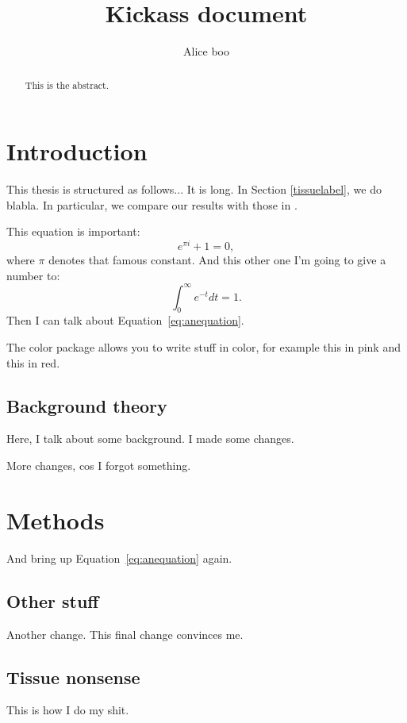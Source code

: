 \documentclass[a4paper,11pt,leqno]{article}
\numberwithin{equation}{section}
\begin{document}

\title{Kickass document}
\author{Alice boo}

\maketitle


\begin{abstract}
This is the abstract.
\end{abstract}


\tableofcontents

\newpage

\section{Introduction}

This thesis is structured as follows... It is long. In Section \ref{tissuelabel}, we do blabla. In particular, we compare our results with those in \cite{RN33}.

This equation is important:
%
$$e^{\pi i}+1=0,$$
%
where $\pi$ denotes that famous constant. And this other one I'm going to give a number to:
%
\begin{equation}\label{eq:anequation}
\int_0^\infty e^{-t}dt = 1.
\end{equation}
%
Then I can talk about Equation~\eqref{eq:anequation}. 

The color package allows you to write stuff in color, for example {\color{magenta} this in pink} and {\color{red} this in red}.

\subsection{Background theory}



Here, I talk about some background. I made some changes.

More changes, cos I forgot something.

\section{Methods}

And bring up Equation~\eqref{eq:anequation} again. 


\subsection{Other stuff}

Another change. This final change convinces me.

\subsection{Tissue nonsense}\label{sec:tissuelabel}
This is how I do my shit.




\end{document}
